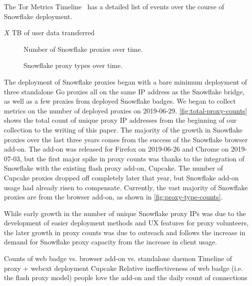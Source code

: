 \documentclass[letterpaper,twocolumn]{article}
\begin{document}

The Tor Metrics Timeline~\cite{tor-metrics-timeline}
has a detailed list of events over the course of Snowflake deployment.

$X$ TB of user data transferred

\begin{figure}
\caption{Number of Snowflake proxies over time.}
\label{fig:total-proxy-counts}
\bigskip
{}
\caption{Snowflake proxy types over time.}
\label{fig:proxy-type-counts}
\end{figure}

The deployment of Snowflake proxies began with a bare minimum deployment
of three standalone Go proxies all on the same IP address as the Snowflake bridge,
as well as a few proxies from deployed Snowflake badges.
We began to collect metrics on the number of deployed proxies on \mbox{2019-06-29}.
\autoref{fig:total-proxy-counts} shows the total count of unique proxy IP addresses
from the beginning of our collection to the writing of this paper.
The majority of the growth in Snowflake proxies over the last three years comes from
the success of the Snowflake browser add-on.
The add-on was released for Firefox on \mbox{2019-06-26} and Chrome on \mbox{2019-07-03},
but the first major spike in proxy counts was thanks to the integration
of Snowflake with the existing flash proxy add-on, Cupcake.
The number of Cupcake proxies dropped off completely later that year,
but Snowflake add-on usage had already risen to compensate.
Currently, the vast majority of Snowflake proxies are from the browser add-on,
as shown in \autoref{fig:proxy-type-counts}.

While early growth in the number of unique Snowflake proxy IPs
was due to the development of easier deployment methods and UX features for proxy volunteers,
the later growth in proxy counts was due to outreach
and follows the increase in demand for Snowflake proxy capacity from the increase in client usage. 

Counts of web badge vs. browser add-on vs. standalone daemon
Timeline of proxy + webext deployment
Cupcake
Relative ineffectiveness of web badge (i.e. the flash proxy model)
people love the add-on and the daily count of connections
\end{document}
